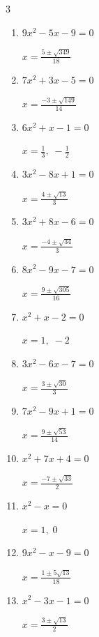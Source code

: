\begin{multicols}{3}
\begin{enumerate}
  \item $9x^{2}-5x-9=0$

        $\displaystyle x=\frac{5\pm \sqrt{349}}{18}$

  \item $7x^{2}+3x-5=0$

        $\displaystyle x=\frac{-3\pm \sqrt{149}}{14}$

  \item $6x^{2}+x-1=0$

        $\displaystyle x=\frac{1}{3}, \; -\frac{1}{2}$

  \item $3x^{2}-8x+1=0$

        $\displaystyle x=\frac{4\pm \sqrt{13}}{3}$

  \item $3x^{2}+8x-6=0$

        $\displaystyle x=\frac{-4\pm \sqrt{34}}{3}$

  \item $8x^{2}-9x-7=0$

        $\displaystyle x=\frac{9\pm \sqrt{305}}{16}$

\columnbreak %

  \item $x^{2}+x-2=0$

        $\displaystyle x=1, \; -2$

  \item $3x^{2}-6x-7=0$

        $\displaystyle x=\frac{3\pm \sqrt{30}}{3}$

  \item $7x^{2}-9x+1=0$

        $\displaystyle x=\frac{9\pm \sqrt{53}}{14}$

  \item $x^{2}+7x+4=0$

        $\displaystyle x=\frac{-7\pm \sqrt{33}}{2}$

  \item $x^{2}-x=0$

        $\displaystyle x=1, \; 0$

  \item $9x^{2}-x-9=0$

        $\displaystyle x=\frac{1\pm 5\sqrt{13}}{18}$

  \item $x^{2}-3x-1=0$

        $\displaystyle x=\frac{3\pm \sqrt{13}}{2}$

\columnbreak %


\end{enumerate}
\end{multicols}
